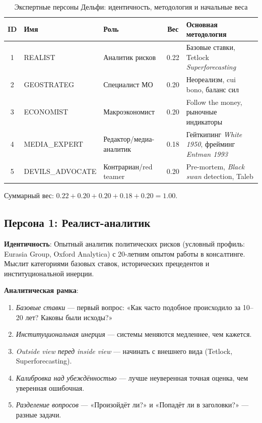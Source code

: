 \begin{table}[h]
\small
\centering
\begin{tabular}{|c|l|l|c|l|}
\hline
\textbf{ID} & \textbf{Имя} & \textbf{Роль} & \textbf{Вес} & \textbf{Основная методология} \\
\hline
\hline
1 & REALIST & Аналитик рисков & 0.22 & Базовые ставки, Tetlock \emph{Superforecasting} \\
\hline
2 & GEOSTRATEG & Специалист МО & 0.20 & Неореализм, cui bono, баланс сил \\
\hline
3 & ECONOMIST & Макроэкономист & 0.20 & Follow the money, рыночные индикаторы \\
\hline
4 & MEDIA\_EXPERT & Редактор/медиа-аналитик & 0.18 & Гейткипинг \emph{White 1950}, фрейминг \emph{Entman 1993} \\
\hline
5 & DEVILS\_ADVOCATE & Контрариан/red teamer & 0.20 & Pre-mortem, \emph{Black swan} detection, Taleb \\
\hline
\end{tabular}
\caption{Экспертные персоны Дельфи: идентичность, методология и начальные веса}
\label{table:personas}
\end{table}

Суммарный вес: $0.22 + 0.20 + 0.20 + 0.18 + 0.20 = 1.00$.

\subsection{Персона 1: Реалист-аналитик}

\textbf{Идентичность}: Опытный аналитик политических рисков (условный профиль: Eurasia Group, Oxford Analytica) с 20-летним опытом работы в консалтинге. Мыслит категориями базовых ставок, исторических прецедентов и институциональной инерции.

\textbf{Аналитическая рамка}:
\begin{enumerate}
    \item \emph{Базовые ставки} — первый вопрос: «Как часто подобное происходило за 10–20 лет? Каковы были исходы?»
    \item \emph{Институциональная инерция} — системы меняются медленнее, чем кажется.
    \item \emph{Outside view перед inside view} — начинать с внешнего вида (Tetlock, Superforecasting).
    \item \emph{Калибровка над убеждённостью} — лучше неуверенная точная оценка, чем уверенная ошибочная.
    \item \emph{Разделение вопросов} — «Произойдёт ли?» и «Попадёт ли в заголовки?» — разные задачи.
\end{enumerate}

